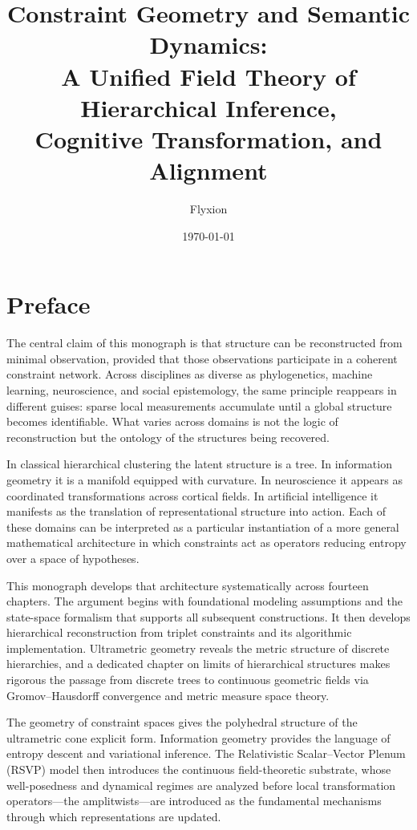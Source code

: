 \documentclass[12pt,a4paper,oneside]{book}
\title{Constraint Geometry and Semantic Dynamics:\\[6pt]
A Unified Field Theory of Hierarchical Inference,\\
Cognitive Transformation, and Alignment}
\author{Flyxion}
\date{\today}
\numberwithin{equation}{chapter}
\theoremstyle{plain}
\theoremstyle{definition}
\theoremstyle{remark}
\begin{document}
\frontmatter

\maketitle

\chapter*{Preface}

The central claim of this monograph is that structure can be
reconstructed from minimal observation, provided that those
observations participate in a coherent constraint network. Across
disciplines as diverse as phylogenetics, machine learning,
neuroscience, and social epistemology, the same principle reappears
in different guises: sparse local measurements accumulate until a
global structure becomes identifiable. What varies across domains is
not the logic of reconstruction but the ontology of the structures
being recovered.

In classical hierarchical clustering the latent structure is a tree.
In information geometry it is a manifold equipped with curvature. In
neuroscience it appears as coordinated transformations across cortical
fields. In artificial intelligence it manifests as the translation of
representational structure into action. Each of these domains can be
interpreted as a particular instantiation of a more general
mathematical architecture in which constraints act as operators
reducing entropy over a space of hypotheses.

This monograph develops that architecture systematically across
fourteen chapters. The argument begins with foundational modeling
assumptions and the state-space formalism that supports all subsequent
constructions. It then develops hierarchical reconstruction from
triplet constraints and its algorithmic implementation. Ultrametric
geometry reveals the metric structure of discrete hierarchies, and a
dedicated chapter on limits of hierarchical structures makes rigorous
the passage from discrete trees to continuous geometric fields via
Gromov--Hausdorff convergence and metric measure space theory.

The geometry of constraint spaces gives the polyhedral structure of
the ultrametric cone explicit form. Information geometry provides the
language of entropy descent and variational inference. The
Relativistic Scalar--Vector Plenum (RSVP) model then introduces the
continuous field-theoretic substrate, whose well-posedness and
dynamical regimes are analyzed before local transformation
operators---the amplitwists---are introduced as the fundamental
mechanisms through which representations are updated.
\end{document}
